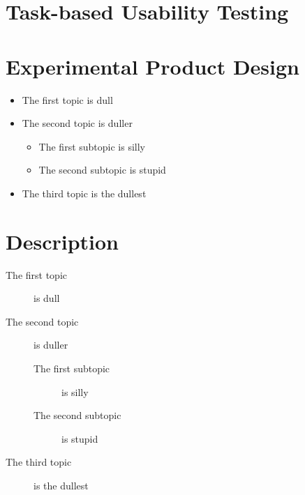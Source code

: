 \section{Task-based Usability Testing}
\label{background:section:task}

\section{Experimental Product Design}
\label{background:section:experimentproduct}

\begin{itemize}
\item The first topic is dull
\item The second topic is duller
\begin{itemize}
\item The first subtopic is silly
\item The second subtopic is stupid
\end{itemize}
\item The third topic is the dullest
\end{itemize}

\section*{Description}
\begin{description}
\item[The first topic] is dull
\item[The second topic] is duller
\begin{description}
\item[The first subtopic] is silly
\item[The second subtopic] is stupid
\end{description}
\item[The third topic] is the dullest
\end{description}


